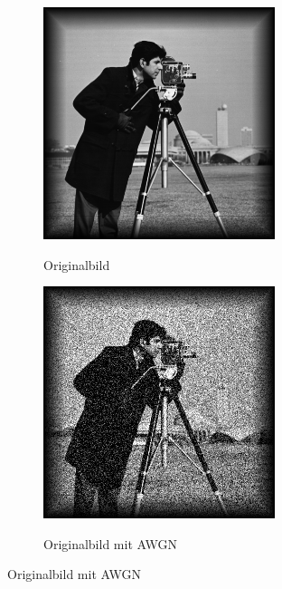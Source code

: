 \newpage
\begin{figure}[!ht]
  \centering
  \begin{subfigure}[b]{.4\linewidth}
    \caption{Originalbild}
    \includegraphics[width=\linewidth]{pictures/introBeta/cameraman.png}
    \label{fig:camerman}
  \end{subfigure}
  \quad
  \begin{subfigure}[b]{.4\linewidth}
    \caption{Originalbild mit AWGN}
    \includegraphics[width=\linewidth]{pictures/introBeta/snr10.png}
    \label{fig:camermanSNR10}
  \end{subfigure}


\end{figure}
